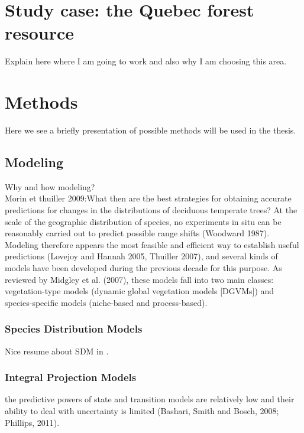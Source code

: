 \section{Study case: the Quebec forest resource}

Explain here where I am going to work and also why I am choosing this area.

\section{Methods}

Here we see a briefly presentation of possible methods will be used in the thesis.

\subsection{Modeling}

Why and how modeling?\\
Morin et thuiller 2009:{What then are the best strategies for obtaining accurate predictions for changes in the distributions of deciduous temperate trees? At the scale of the geographic distribution of species, no experiments in situ can be reasonably carried out to predict possible range shifts (Woodward 1987). Modeling therefore appears the most feasible and efficient way to establish useful predictions (Lovejoy and Hannah 2005, Thuiller 2007), and several kinds of models have been developed during the previous decade for this purpose. As reviewed by Midgley et al. (2007), these models fall into two main classes: vegetation-type models (dynamic global vegetation models [DGVMs]) and species-specific models (niche-based and process-based).}

\subsubsection{Species Distribution Models}\label{sdm}

Nice resume about SDM in \citet{Moran-Ordonez2016}.

\subsubsection{Integral Projection Models}

the predictive powers of state and transition models are relatively low and their ability to deal with uncertainty is limited (Bashari, Smith and Bosch, 2008; Phillips, 2011).

